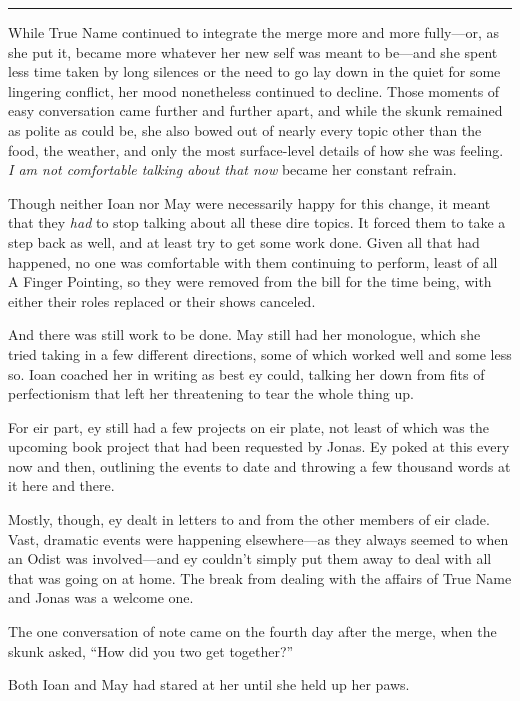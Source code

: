 \begin{center}\rule{0.5\linewidth}{0.5pt}\end{center}

While True Name continued to integrate the merge more and more fully—or, as she put it, became more whatever her new self was meant to be—and she spent less time taken by long silences or the need to go lay down in the quiet for some lingering conflict, her mood nonetheless continued to decline. Those moments of easy conversation came further and further apart, and while the skunk remained as polite as could be, she also bowed out of nearly every topic other than the food, the weather, and only the most surface-level details of how she was feeling. \emph{I am not comfortable talking about that now} became her constant refrain.

Though neither Ioan nor May were necessarily happy for this change, it meant that they \emph{had} to stop talking about all these dire topics. It forced them to take a step back as well, and at least try to get some work done. Given all that had happened, no one was comfortable with them continuing to perform, least of all A Finger Pointing, so they were removed from the bill for the time being, with either their roles replaced or their shows canceled.

And there was still work to be done. May still had her monologue, which she tried taking in a few different directions, some of which worked well and some less so. Ioan coached her in writing as best ey could, talking her down from fits of perfectionism that left her threatening to tear the whole thing up.

For eir part, ey still had a few projects on eir plate, not least of which was the upcoming book project that had been requested by Jonas. Ey poked at this every now and then, outlining the events to date and throwing a few thousand words at it here and there.

Mostly, though, ey dealt in letters to and from the other members of eir clade. Vast, dramatic events were happening elsewhere—as they always seemed to when an Odist was involved—and ey couldn't simply put them away to deal with all that was going on at home. The break from dealing with the affairs of True Name and Jonas was a welcome one.

The one conversation of note came on the fourth day after the merge, when the skunk asked, ``How did you two get together?''

Both Ioan and May had stared at her until she held up her paws.

